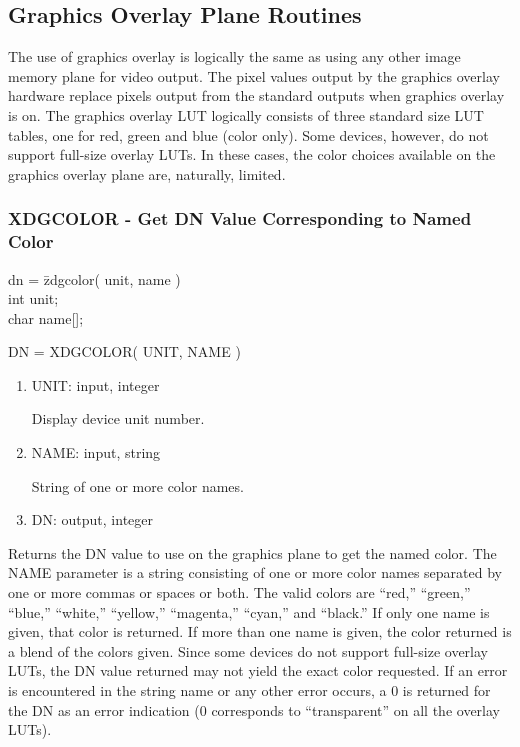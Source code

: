 \subsection{Graphics Overlay Plane Routines}
The use of graphics overlay is logically the same as using any other
image memory plane for video output.  The pixel values output by the
graphics overlay hardware replace pixels output from the standard
outputs when graphics overlay is on.  The graphics overlay LUT
logically consists of three standard size LUT tables, one for red,
green and blue (color only).  Some devices, however, do not support
full-size overlay LUTs.  In these cases, the color choices available
on the graphics overlay plane are, naturally, limited.
\newpage
\subsubsection{XDGCOLOR - Get DN Value Corresponding to Named Color}
\begin{tabbing}
dn = \=zdgcolor( unit, name )\\
\>int  unit;\\
\>char  name[];\\
\end{tabbing}
DN = XDGCOLOR( UNIT, NAME )
\begin{enumerate}
\item UNIT:  input, integer

Display device unit number.
\item NAME:  input, string

String of one or more color names.
\item DN:  output, integer
\end{enumerate}
Returns the DN value to use on the graphics plane to get the named
color.  The NAME parameter is a string consisting of one or more
color names separated by one or more commas or spaces or both.  The
valid colors are ``red,'' ``green,'' ``blue,'' ``white,'' ``yellow,''
``magenta,'' ``cyan,'' and ``black.''  If only one name is given, that
color is returned.  If more than one name is given, the color
returned is a blend of the colors given.  Since some devices do not
support full-size overlay LUTs, the DN value returned may not yield
the exact color requested.  If an error is encountered in the string
name or any other error occurs, a 0 is returned for the DN as an
error indication (0 corresponds to ``transparent'' on all the overlay LUTs).
\newpage
